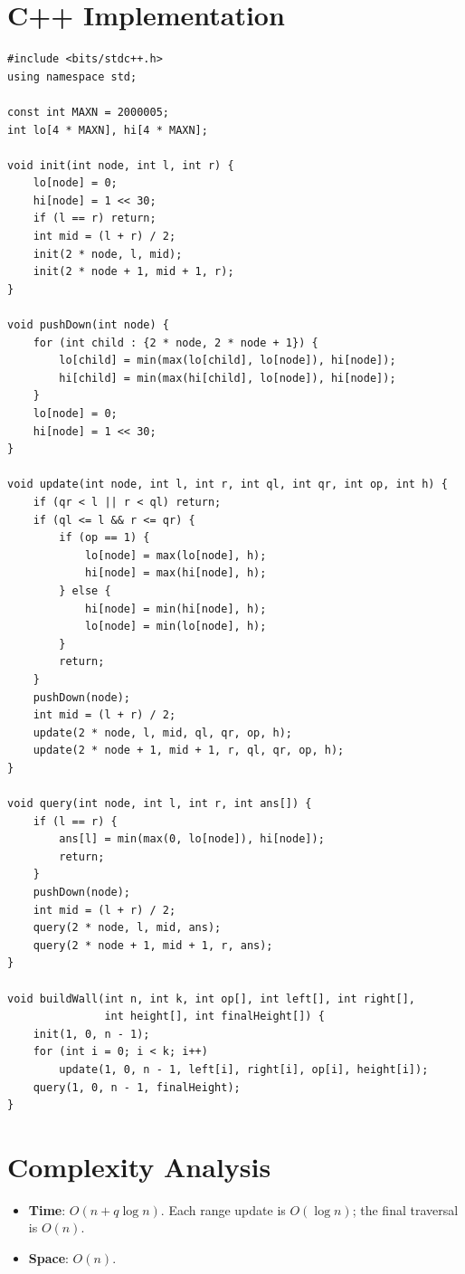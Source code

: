 \documentclass[11pt,a4paper]{article}
\begin{document}
\section{C++ Implementation}

\begin{lstlisting}
#include <bits/stdc++.h>
using namespace std;

const int MAXN = 2000005;
int lo[4 * MAXN], hi[4 * MAXN];

void init(int node, int l, int r) {
    lo[node] = 0;
    hi[node] = 1 << 30;
    if (l == r) return;
    int mid = (l + r) / 2;
    init(2 * node, l, mid);
    init(2 * node + 1, mid + 1, r);
}

void pushDown(int node) {
    for (int child : {2 * node, 2 * node + 1}) {
        lo[child] = min(max(lo[child], lo[node]), hi[node]);
        hi[child] = min(max(hi[child], lo[node]), hi[node]);
    }
    lo[node] = 0;
    hi[node] = 1 << 30;
}

void update(int node, int l, int r, int ql, int qr, int op, int h) {
    if (qr < l || r < ql) return;
    if (ql <= l && r <= qr) {
        if (op == 1) {
            lo[node] = max(lo[node], h);
            hi[node] = max(hi[node], h);
        } else {
            hi[node] = min(hi[node], h);
            lo[node] = min(lo[node], h);
        }
        return;
    }
    pushDown(node);
    int mid = (l + r) / 2;
    update(2 * node, l, mid, ql, qr, op, h);
    update(2 * node + 1, mid + 1, r, ql, qr, op, h);
}

void query(int node, int l, int r, int ans[]) {
    if (l == r) {
        ans[l] = min(max(0, lo[node]), hi[node]);
        return;
    }
    pushDown(node);
    int mid = (l + r) / 2;
    query(2 * node, l, mid, ans);
    query(2 * node + 1, mid + 1, r, ans);
}

void buildWall(int n, int k, int op[], int left[], int right[],
               int height[], int finalHeight[]) {
    init(1, 0, n - 1);
    for (int i = 0; i < k; i++)
        update(1, 0, n - 1, left[i], right[i], op[i], height[i]);
    query(1, 0, n - 1, finalHeight);
}
\end{lstlisting}

\section{Complexity Analysis}

\begin{itemize}
  \item \textbf{Time}: $O(n + q \log n)$. Each range update is $O(\log n)$; the final traversal is $O(n)$.
  \item \textbf{Space}: $O(n)$.
\end{itemize}
\end{document}
